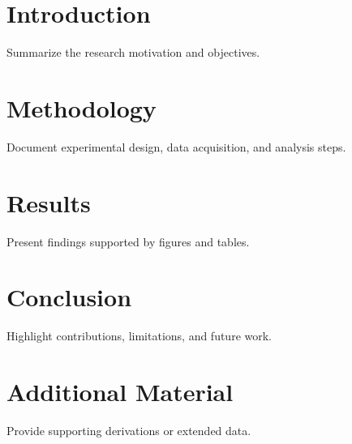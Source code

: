 \documentclass[
    language=english,
    doctype=thesis,
    institution=none,
    titlestyle=thesis
]{../../omnilatex}
\begin{document}
\frontmatter
\maketitle
\tableofcontents

\mainmatter
\chapter{Introduction}
Summarize the research motivation and objectives.

\chapter{Methodology}
Document experimental design, data acquisition, and analysis steps.

\chapter{Results}
Present findings supported by figures and tables.

\chapter{Conclusion}
Highlight contributions, limitations, and future work.

\appendix
\chapter{Additional Material}
Provide supporting derivations or extended data.

\backmatter
\printbibliography
\end{document}
